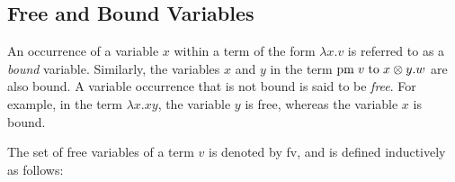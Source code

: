 


\subsection{Free and Bound Variables}
An occurrence of a variable $x$ within a term of the form $\lambda x.v$ is referred to as a \emph{bound} variable.  Similarly, the variables $x$ and $y$ in the term $\text{pm} \hspace{3 pt} v \hspace{3 pt} \text{to} \hspace{3 pt} x \otimes y. w$ are also bound. A variable occurrence that is not bound is said to be \emph{free}. For example, in the term $\lambda x.xy$, the variable $y$ is free, whereas the variable $x$ is bound.  

The set of free variables of a term $v$ is denoted by \gls{fv}, and is defined inductively as follows:

\begin{comment}
\begin{equation*}
\begin{split}
FV(x) &= \{x\}, &  FV(*) &= \emptyset,  \\
FV(f(v_1, \ldots, v_n)), &= FV(v_1) \cup \ldots \cup FV(v_n)& FV(\lambda x: \mathbb{A}. v) &= FV(v) \backslash \{x\}, \\
FV(v w) &= FV(v) \cup FV(w), & FV(v \otimes w) &= FV(v) \cup FV(w), \\
FV(\text{pm} \hspace{3 pt} v \hspace{3 pt} \text{to} \hspace{3 pt} x \otimes y. w), &= FV(v) \cup (FV(w)  \backslash \{x,y\}) & FV(\text{dis}(v)) &= FV(v),\\
FV(v \text{ to } *.w) &= FV(v) \cup FV(w)  &  FV(\text{inl}_\typeB) &=  FV(v). \\
\end{split}
\end{equation*}
\end{comment}

